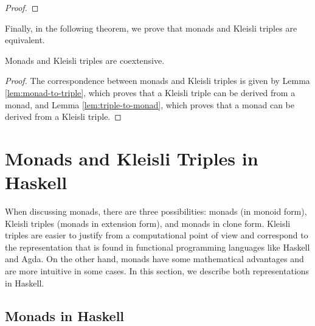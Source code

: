 \begin{lemma}
\begin{proof}
  \end{proof}

\end{lemma}

Finally, in the following theorem, we prove that monads and Kleisli
triples are equivalent.

\begin{theorem}
  \label{the:monad-triple}

  Monads and Kleisli triples are coextensive.

  \begin{proof}

    The correspondence between monads and Kleisli triples is given by
    Lemma \ref{lem:monad-to-triple}, which proves that a Kleisli
    triple can be derived from a monad, and Lemma
    \ref{lem:triple-to-monad}, which proves that a monad can be
    derived from a Kleisli triple.

  \end{proof}

\end{theorem}

\section{Monads and Kleisli Triples in Haskell}
\label{sec:monads-haskell}

When discussing monads, there are three possibilities: monads (in
monoid form), Kleisli triples (monads in extension form), and monads
in clone form. Kleisli triples are easier to justify from a
computational point of view and correspond to the representation that
is found in functional programming languages like Haskell and Agda. On
the other hand, monads have some mathematical advantages and are more
intuitive in some cases. In this section, we describe both
representations in Haskell.

\subsection{Monads in Haskell}

